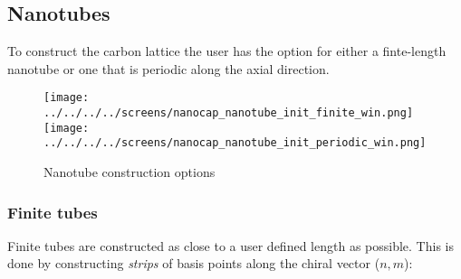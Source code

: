 %
%
%

\subsection{Nanotubes}
%
%
%
%
%
%
%
%

To construct the carbon lattice the user has the option for either a finte-length nanotube or one that is periodic along the axial direction. 

 \begin{figure}[h!]
\centering
\texttt{[image: ../../../../screens/nanocap\_nanotube\_init\_finite\_win.png]}
\texttt{[image: ../../../../screens/nanocap\_nanotube\_init\_periodic\_win.png]}
\caption{Nanotube construction options}
\label{nanotube_constructure_options}
\end{figure}

\subsubsection{Finite tubes}

Finite tubes are constructed as close to a user defined length as possible. This is done by constructing \textit{strips} of basis points along the chiral vector ($n,m$):

